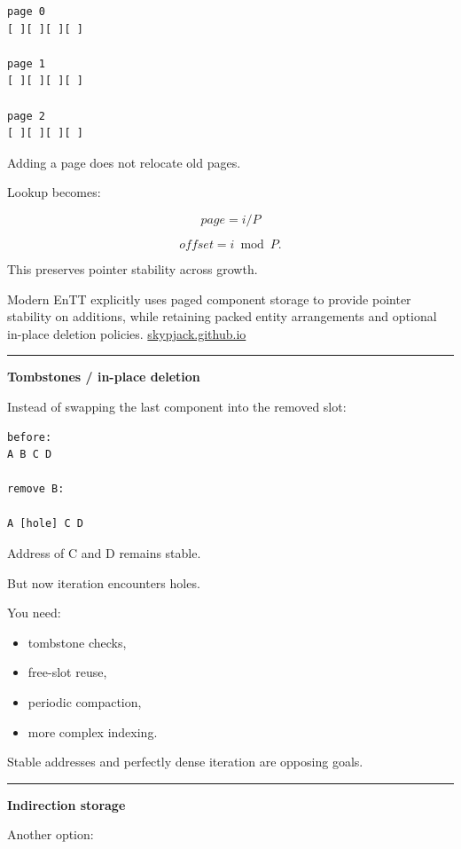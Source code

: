 \begin{verbatim}
page 0
[ ][ ][ ][ ]

page 1
[ ][ ][ ][ ]

page 2
[ ][ ][ ][ ]
\end{verbatim}

Adding a page does not relocate old pages.

Lookup becomes:

\[
page=i/P
\]

\[
offset=i\bmod P.
\]

This preserves pointer stability across growth.

Modern EnTT explicitly uses paged component storage to provide pointer stability on additions, while retaining packed entity arrangements and optional in-place deletion policies. \href{https://skypjack.github.io/entt/md_docs_2md_2entity.html?utm_source=chatgpt.com}{skypjack.github.io}

\begin{center}\rule{0.5\linewidth}{0.5pt}\end{center}

\textbf{Tombstones / in-place deletion}

Instead of swapping the last component into the removed slot:

\begin{verbatim}
before:
A B C D

remove B:

A [hole] C D
\end{verbatim}

Address of C and D remains stable.

But now iteration encounters holes.

You need:

\begin{itemize}
\tightlist
\item
  tombstone checks,
\item
  free-slot reuse,
\item
  periodic compaction,
\item
  more complex indexing.
\end{itemize}

Stable addresses and perfectly dense iteration are opposing goals.

\begin{center}\rule{0.5\linewidth}{0.5pt}\end{center}

\textbf{Indirection storage}

Another option:

